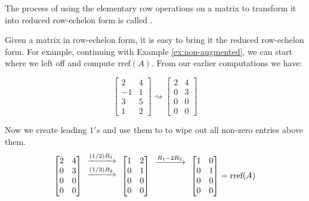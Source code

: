 \documentclass{ximera}
\begin{document}
\begin{definition}\label{def:GaussJordanElimination}
The process of using the elementary row operations on a matrix to transform it into reduced row-echelon form is called .
\end{definition}

Given a matrix in row-echelon form, it is easy to bring it the reduced row-echelon form.  For example, continuing with Example \ref{ex:non-augmented}, we can start where we left off and compute $\mbox{rref}(A)$.  From our earlier computations we have:

$$\begin{bmatrix}2&4\\-1&1\\3&5\\1&2\end{bmatrix}\rightsquigarrow\begin{bmatrix}2&4\\0&3\\0&0\\0&0\end{bmatrix}$$

Now we create leading $1's$ and use them to to wipe out all non-zero entries above them.
$$\begin{bmatrix}2&4\\0&3\\0&0\\0&0\end{bmatrix}
  \begin{array}{c}
    \xrightarrow{(1/2)R_1}\\
  \xrightarrow{(1/3)R_2}\\
  \\ 
  \\
 \end{array}
\begin{bmatrix}1&2\\0&1\\0&0\\0&0\end{bmatrix}
  \begin{array}{c}
  \xrightarrow{R_1-2R_2}\\
\\
\\
 \\
 \end{array}
\begin{bmatrix}1&0\\0&1\\0&0\\0&0\end{bmatrix}=\textnormal{rref}(A)$$
\end{document}
